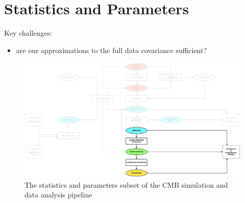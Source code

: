 
\section{Statistics and Parameters}

Key challenges:
\begin{itemize}
\item are our approximations to the full data covariance sufficient?
\end{itemize}

\begin{figure}[htbp]
\centering
\includegraphics[width=1\textwidth]{Analysis/sp}
\caption{The statistics and parameters subset of the CMB simulation and data analysis pipeline}
\label{default}

\end{figure}


%



